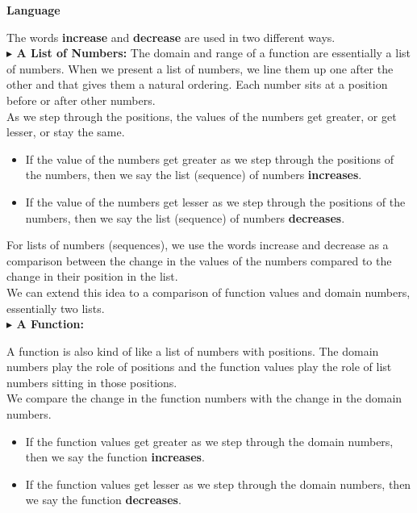 \documentclass{ximera}
\begin{document}
\begin{warning} \textbf{\textcolor{red!70!black}{Language}}

The words \textbf{increase} and \textbf{decrease} are used in two different ways. \\


\textbf{\textcolor{blue!55!black}{$\blacktriangleright$ A List of Numbers:}} The domain and range of a function are essentially a list of numbers. When we present a list of numbers, we line them up one after the other and that gives them a natural ordering.  Each number sits at a position before or after other numbers. \\

As we step through the positions, the values of the numbers get greater, or get lesser, or stay the same. \\ 

\begin{itemize}
    \item If the value of the numbers get greater as we step through the positions of the numbers, then we say the list (sequence) of numbers \textbf{increases}.  
    \item If the value of the numbers get lesser as we step through the positions of the numbers, then we say the list (sequence) of numbers \textbf{decreases}. 
\end{itemize}


For lists of numbers (sequences), we use the words increase and decrease as a comparison between the change in the values of the numbers compared to the change in their position in the list. \\


We can extend this idea to a comparison of function values and domain numbers, essentially two lists. \\

\textbf{\textcolor{blue!55!black}{$\blacktriangleright$ A Function:}} 

A function is also kind of like a list of numbers with positions.  The domain numbers play the role of positions and the function values play the role of list numbers sitting in those positions. \\

We compare the change in the function numbers with the change in the domain numbers. \\

\begin{itemize}
    \item If the function values get greater as we step through the domain numbers, then we say the function \textbf{increases}.  
    \item If the function values get lesser as we step through the domain numbers, then we say the function \textbf{decreases}.  
\end{itemize}


\end{warning}
\end{document}
